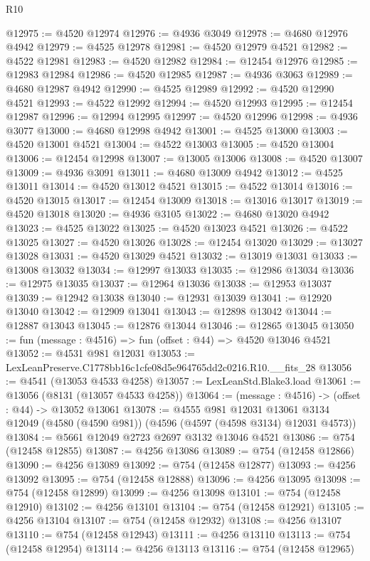 \begin{lexlean}{R10}
\begin{coremodule}
@12975 := @4520 @12974
@12976 := @4936 @3049
@12978 := @4680 @12976 @4942
@12979 := @4525 @12978
@12981 := @4520 @12979 @4521
@12982 := @4522 @12981
@12983 := @4520 @12982
@12984 := @12454 @12976
@12985 := @12983 @12984
@12986 := @4520 @12985
@12987 := @4936 @3063
@12989 := @4680 @12987 @4942
@12990 := @4525 @12989
@12992 := @4520 @12990 @4521
@12993 := @4522 @12992
@12994 := @4520 @12993
@12995 := @12454 @12987
@12996 := @12994 @12995
@12997 := @4520 @12996
@12998 := @4936 @3077
@13000 := @4680 @12998 @4942
@13001 := @4525 @13000
@13003 := @4520 @13001 @4521
@13004 := @4522 @13003
@13005 := @4520 @13004
@13006 := @12454 @12998
@13007 := @13005 @13006
@13008 := @4520 @13007
@13009 := @4936 @3091
@13011 := @4680 @13009 @4942
@13012 := @4525 @13011
@13014 := @4520 @13012 @4521
@13015 := @4522 @13014
@13016 := @4520 @13015
@13017 := @12454 @13009
@13018 := @13016 @13017
@13019 := @4520 @13018
@13020 := @4936 @3105
@13022 := @4680 @13020 @4942
@13023 := @4525 @13022
@13025 := @4520 @13023 @4521
@13026 := @4522 @13025
@13027 := @4520 @13026
@13028 := @12454 @13020
@13029 := @13027 @13028
@13031 := @4520 @13029 @4521
@13032 := @13019 @13031
@13033 := @13008 @13032
@13034 := @12997 @13033
@13035 := @12986 @13034
@13036 := @12975 @13035
@13037 := @12964 @13036
@13038 := @12953 @13037
@13039 := @12942 @13038
@13040 := @12931 @13039
@13041 := @12920 @13040
@13042 := @12909 @13041
@13043 := @12898 @13042
@13044 := @12887 @13043
@13045 := @12876 @13044
@13046 := @12865 @13045
@13050 := fun (message : @4516) => fun (offset : @44) => @4520 @13046 @4521
@13052 := @4531 @981 @12031
@13053 := LexLeanPreserve.C1778bb16c1cfe08d5e964765dd2c0216.R10.__fits_28
@13056 := @4541 (@13053 @4533 @4258)
@13057 := LexLeanStd.Blake3.load
@13061 := @13056 (@8131 (@13057 @4533 @4258))
@13064 := (message : @4516) -> (offset : @44) -> @13052 @13061
@13078 := @4555
    @981
    @12031
    @13061
    @3134
    @12049
    (@4580 (@4590 @981))
    (@4596 (@4597 (@4598 @3134) @12031 @4573))
@13084 := @5661 @12049 @2723 @2697 @3132 @13046 @4521
@13086 := @754 (@12458 @12855)
@13087 := @4256 @13086
@13089 := @754 (@12458 @12866)
@13090 := @4256 @13089
@13092 := @754 (@12458 @12877)
@13093 := @4256 @13092
@13095 := @754 (@12458 @12888)
@13096 := @4256 @13095
@13098 := @754 (@12458 @12899)
@13099 := @4256 @13098
@13101 := @754 (@12458 @12910)
@13102 := @4256 @13101
@13104 := @754 (@12458 @12921)
@13105 := @4256 @13104
@13107 := @754 (@12458 @12932)
@13108 := @4256 @13107
@13110 := @754 (@12458 @12943)
@13111 := @4256 @13110
@13113 := @754 (@12458 @12954)
@13114 := @4256 @13113
@13116 := @754 (@12458 @12965)

\end{coremodule}
\end{lexlean}
